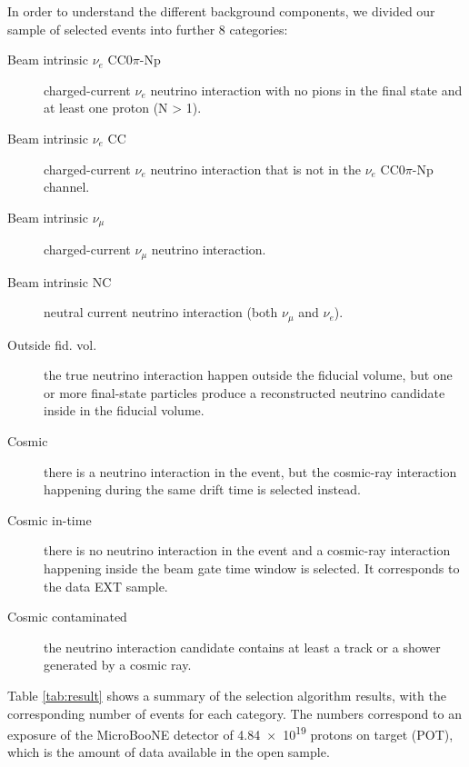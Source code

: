 In order to understand the different background components, we divided our sample of selected events into further 8 categories:
\begin{description}
\item[Beam intrinsic $\nu_{e}$ CC$0\pi$-Np] charged-current $\nu_{e}$ neutrino interaction with no pions in the final state and at least one proton (N > 1).
\item[Beam intrinsic $\nu_{e}$ CC] charged-current $\nu_{e}$ neutrino interaction that is not in the $\nu_{e}$ CC$0\pi$-Np channel.
\item[Beam intrinsic $\nu_{\mu}$] charged-current $\nu_{\mu}$ neutrino interaction.
\item[Beam intrinsic NC] neutral current neutrino interaction (both $\nu_{\mu}$ and $\nu_{e}$).
\item[Outside fid. vol.] the true neutrino interaction happen outside the fiducial volume, but one or more final-state particles produce a reconstructed neutrino candidate inside in the fiducial volume.
\item[Cosmic] there is a neutrino interaction in the event, but the cosmic-ray interaction happening during the same drift time is selected instead.
\item[Cosmic in-time] there is no neutrino interaction in the event and a cosmic-ray interaction happening inside the beam gate time window is selected. It corresponds to the data EXT sample.
\item[Cosmic contaminated] the neutrino interaction candidate contains at least a track or a shower generated by a cosmic ray.
\end{description}


Table \ref{tab:result} shows a summary of the selection algorithm results, with the corresponding number of events for each category. The numbers correspond to an exposure of the MicroBooNE detector of \num{4.84e19} protons on target (POT), which is the amount of data available in the open sample.

